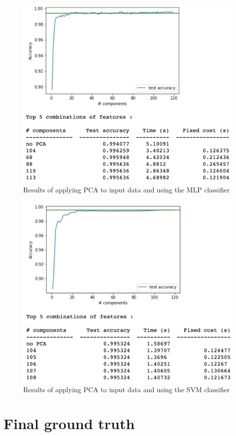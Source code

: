 \begin{appendix}
    \begin{figure}[!ht]
    \centering
      \includegraphics[width=0.68\linewidth]{Figures/mlp_pca.png}
      \captionsetup{justification=centering}
      \caption{Results of applying PCA to input data and using the MLP classifier}
      \label{fig:mlp_pca}
    \end{figure}
    
    \begin{figure}[!ht]
    \centering
      \includegraphics[width=0.68\linewidth]{Figures/svm_pca.png}
      \caption{Results of applying PCA to input data and using the SVM classifier}
      \label{fig:svm_pca}
    \end{figure}
    
    \chapter{Final ground truth}
    \label{gt_stats}
    

\end{appendix}
